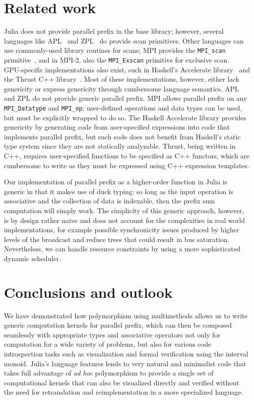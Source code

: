 \documentclass{sig-alternate}
\newcommand{\code}[1]{\texttt{#1}}
\begin{document}
\section{Related work}

Julia does not provide parallel prefix in the base library; however, several
languages like APL~\cite{Iverson1962,Iverson1979} and
ZPL~\cite{Chamberlain2000} do provide scan primitives. Other languages can use 
commonly-used library routines for scans; MPI provides the \code{MPI\_scan}
primitive~\cite{Snir1995,MPI}, and in MPI-2, also the \code{MPI\_Exscan}
primitive for exclusive scan.~\cite{MPI2} GPU-specific implementations also
exist, such in Haskell's Accelerate library~\cite{Chakravarty2011} and the
Thrust C++ library~\cite{Bell2012}. Most of these implementations, however,
either lack genericity or express genericity through cumbersome language
semantics. APL and ZPL do not provide generic parallel prefix. MPI allows
parallel prefix on any \code{MPI\_Datatype} and \code{MPI\_op}; user-defined
operations and data types can be used, but must be explicitly wrapped to do so.
The Haskell Accelerate library provides genericity by generating code from
user-specified expressions into code that implements parallel prefix, but such
code does not benefit from Haskell's static type system since they are not
statically analyzable. Thrust, being written in C++, requires user-specified
functions to be specified as C++ functors, which are cumbersome to write as
they must be expressed using C++ expression templates.

Our implementation of parallel prefix as a higher-order function in Julia is
generic in that it makes use of duck typing: so long as the input operation is
associative and the collection of data is indexable, then the prefix sum
computation will simply work. The simplicity of this generic approach, however,
is by design rather naive and does not account for the complexities in real
world implementations, for example possible synchronicity issues produced
by higher levels of the broadcast and reduce trees that could result in bus
saturation. Nevertheless, we can handle resource constraints by using a more
sophisticated dynamic scheduler.

\section{Conclusions and outlook}

We have demonstrated how polymorphism using multimethods allows us to write
generic computation kernels for parallel prefix, which can then be composed
seamlessly with appropriate types and associative operators not only for
computation for a wide variety of problems, but also for various code
introspection tasks such as visualization and formal verification using the
interval monoid. Julia's language features lends to very natural and minimalist
code that takes full advantage of \textit{ad hoc} polymorphism to provide a
single set of computational kernels that can also be visualized directly and
verified without the need for retranslation and reimplementation in a more
specialized language.
\end{document}
